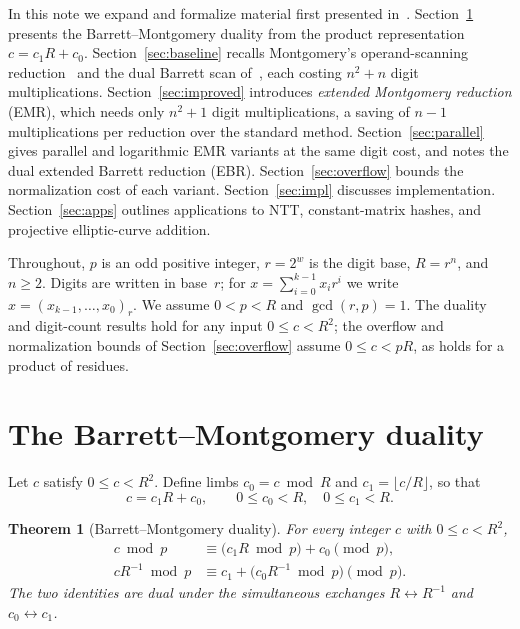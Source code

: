 \documentclass[reqno]{amsart}
\newtheorem{theorem}{Theorem}[section]
\theoremstyle{definition}
\begin{document}
In this note we expand and formalize material first presented in~\cite{domb2025blog}.
Section~\ref{sec:duality} presents the Barrett--Montgomery duality from the product representation $c=c_1R+c_0$.
Section~\ref{sec:baseline} recalls Montgomery's operand-scanning reduction~\cite{montgomery} and the dual Barrett scan of~\cite{domb2025blog}, each costing $n^2+n$ digit multiplications.
Section~\ref{sec:improved} introduces \emph{extended Montgomery reduction} (EMR), which needs only $n^2+1$ digit multiplications, a saving of $n-1$ multiplications per reduction over the standard method.
Section~\ref{sec:parallel} gives parallel and logarithmic EMR variants at the same digit cost, and notes the dual extended Barrett reduction (EBR).
Section~\ref{sec:overflow} bounds the normalization cost of each variant.
Section~\ref{sec:impl} discusses implementation.
Section~\ref{sec:apps} outlines applications to NTT, constant-matrix hashes, and projective elliptic-curve addition.

Throughout, $p$ is an odd positive integer, $r=2^w$ is the digit base, $R=r^n$, and $n\ge 2$.
Digits are written in base~$r$; for $x=\sum_{i=0}^{k-1} x_i r^i$ we write $x=(x_{k-1},\ldots,x_0)_r$.
We assume $0<p<R$ and $\gcd(r,p)=1$.
The duality and digit-count results hold for any input $0\le c<R^2$; the overflow and normalization bounds of Section~\ref{sec:overflow} assume $0\le c<pR$, as holds for a product of residues.

\section{The Barrett--Montgomery duality}\label{sec:duality}

Let $c$ satisfy $0\le c<R^2$.  Define limbs $c_0=c\bmod R$ and $c_1=\lfloor c/R\rfloor$, so that
\begin{equation}\label{eq:split}
  c = c_1 R + c_0, \qquad 0\le c_0<R,\quad 0\le c_1<R.
\end{equation}

\begin{theorem}[Barrett--Montgomery duality]\label{thm:duality}
For every integer $c$ with $0\le c<R^2$,
\begin{align}
  c \bmod p &\equiv \bigl(c_1 R \bmod p\bigr) + c_0 \pmod p, \label{eq:barrett-dual}\\
  c R^{-1} \bmod p &\equiv c_1 + \bigl(c_0 R^{-1} \bmod p\bigr) \pmod p. \label{eq:mont-dual}
\end{align}
The two identities are dual under the simultaneous exchanges $R\leftrightarrow R^{-1}$ and $c_0\leftrightarrow c_1$.
\end{theorem}
\end{document}
